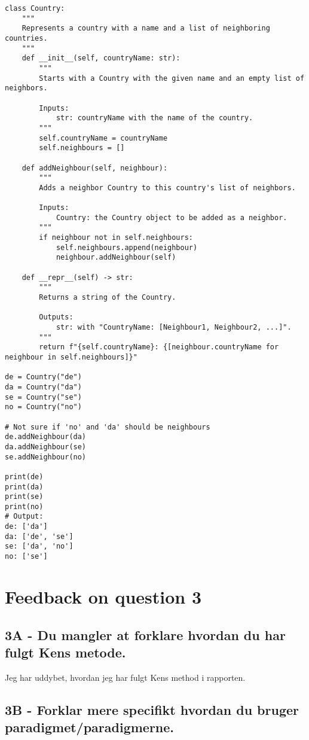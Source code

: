 \documentclass[a4paper,12pt]{article}
\begin{document}
\begin{lstlisting}
class Country:
    """
    Represents a country with a name and a list of neighboring countries.
    """
    def __init__(self, countryName: str):
        """
        Starts with a Country with the given name and an empty list of neighbors.

        Inputs:
            str: countryName with the name of the country.
        """
        self.countryName = countryName
        self.neighbours = []
    
    def addNeighbour(self, neighbour):
        """
        Adds a neighbor Country to this country's list of neighbors.

        Inputs:
            Country: the Country object to be added as a neighbor.
        """
        if neighbour not in self.neighbours:
            self.neighbours.append(neighbour)
            neighbour.addNeighbour(self)
    
    def __repr__(self) -> str:
        """
        Returns a string of the Country.
        
        Outputs:
            str: with "CountryName: [Neighbour1, Neighbour2, ...]".
        """
        return f"{self.countryName}: {[neighbour.countryName for neighbour in self.neighbours]}"
    
de = Country("de")
da = Country("da")
se = Country("se")
no = Country("no")
    
# Not sure if 'no' and 'da' should be neighbours
de.addNeighbour(da)
da.addNeighbour(se)
se.addNeighbour(no)
    
print(de)
print(da)
print(se)
print(no)
# Output:
de: ['da']
da: ['de', 'se']
se: ['da', 'no']
no: ['se']
\end{lstlisting}

\section{Feedback on question 3}

\subsection*{3A - Du mangler at forklare hvordan du har fulgt Kens metode.}

Jeg har uddybet, hvordan jeg har fulgt Kens method i rapporten.

\subsection*{3B - Forklar mere specifikt hvordan du bruger paradigmet/paradigmerne.}
\end{document}

